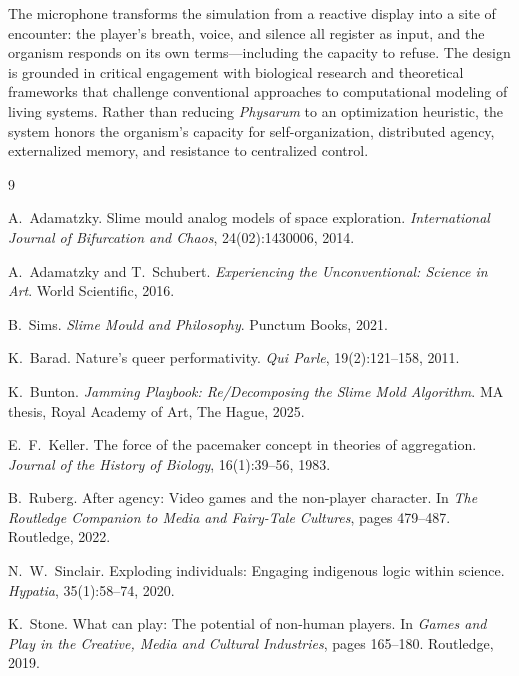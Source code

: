 \documentclass[12pt, titlepage]{article}
\begin{document}
The microphone transforms the simulation from a reactive display into a site
of encounter: the player's breath, voice, and silence all register as input,
and the organism responds on its own terms---including the capacity to refuse.
The design is grounded in critical engagement with biological research and
theoretical frameworks that challenge conventional approaches to computational
modeling of living systems. Rather than reducing \textit{Physarum} to an
optimization heuristic, the system honors the organism's capacity for
self-organization, distributed agency, externalized memory, and resistance to
centralized control.

\begin{thebibliography}{9}

A.~Adamatzky.
\newblock Slime mould analog models of space exploration.
\newblock \textit{International Journal of Bifurcation and Chaos}, 24(02):1430006, 2014.

A.~Adamatzky and T.~Schubert.
\newblock \textit{Experiencing the Unconventional: Science in Art}.
\newblock World Scientific, 2016.

B.~Sims.
\newblock \textit{Slime Mould and Philosophy}.
\newblock Punctum Books, 2021.

K.~Barad.
\newblock Nature's queer performativity.
\newblock \textit{Qui Parle}, 19(2):121--158, 2011.

K.~Bunton.
\newblock \textit{Jamming Playbook: Re/Decomposing the Slime Mold Algorithm}.
\newblock MA thesis, Royal Academy of Art, The Hague, 2025.

E.~F.~Keller.
\newblock The force of the pacemaker concept in theories of aggregation.
\newblock \textit{Journal of the History of Biology}, 16(1):39--56, 1983.

B.~Ruberg.
\newblock After agency: Video games and the non-player character.
\newblock In \textit{The Routledge Companion to Media and Fairy-Tale Cultures}, pages 479--487. Routledge, 2022.

N.~W.~Sinclair.
\newblock Exploding individuals: Engaging indigenous logic within science.
\newblock \textit{Hypatia}, 35(1):58--74, 2020.

K.~Stone.
\newblock What can play: The potential of non-human players.
\newblock In \textit{Games and Play in the Creative, Media and Cultural Industries}, pages 165--180. Routledge, 2019.

\end{thebibliography}
\end{document}
